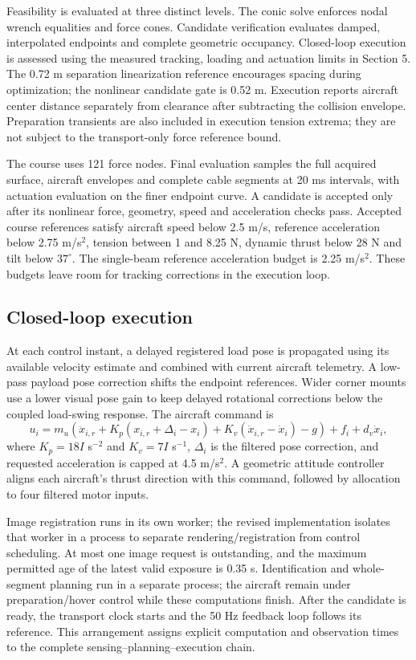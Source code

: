 Feasibility is evaluated at three distinct levels. The conic solve enforces nodal wrench equalities and force cones. Candidate verification evaluates damped, interpolated endpoints and complete geometric occupancy. Closed-loop execution is assessed using the measured tracking, loading and actuation limits in Section 5. The 0.72 m separation linearization reference encourages spacing during optimization; the nonlinear candidate gate is 0.52 m. Execution reports aircraft center distance separately from clearance after subtracting the collision envelope. Preparation transients are also included in execution tension extrema; they are not subject to the transport-only force reference bound.

The course uses 121 force nodes. Final evaluation samples the full acquired surface, aircraft envelopes and complete cable segments at 20 ms intervals, with actuation evaluation on the finer endpoint curve. A candidate is accepted only after its nonlinear force, geometry, speed and acceleration checks pass. Accepted course references satisfy aircraft speed below 2.5 m/s, reference acceleration below 2.75 m/s$^2$, tension between 1 and 8.25 N, dynamic thrust below 28 N and tilt below $37^\circ$. The single-beam reference acceleration budget is 2.25 m/s$^2$. These budgets leave room for tracking corrections in the execution loop.

\subsection{Closed-loop execution}
At each control instant, a delayed registered load pose is propagated using its available velocity estimate and combined with current aircraft telemetry. A low-pass payload pose correction shifts the endpoint references. Wider corner mounts use a lower visual pose gain to keep delayed rotational corrections below the coupled load-swing response. The aircraft command is
\begin{equation}
 u_i=m_u\left(\ddot x_{i,r}+K_p(x_{i,r}+\Delta_i-x_i)
      +K_v(\dot x_{i,r}-\dot x_i)-g\right)+f_i+d_v\dot x_i,
 \label{eq:controller}
\end{equation}
where $K_p=18I$ s$^{-2}$ and $K_v=7I$ s$^{-1}$, $\Delta_i$ is the filtered pose correction, and requested acceleration is capped at 4.5 m/s$^2$. A geometric attitude controller~\cite{lee2010} aligns each aircraft's thrust direction with this command, followed by allocation to four filtered motor inputs.

Image registration runs in its own worker; the revised implementation isolates that worker in a process to separate rendering/registration from control scheduling. At most one image request is outstanding, and the maximum permitted age of the latest valid exposure is 0.35 s. Identification and whole-segment planning run in a separate process; the aircraft remain under preparation/hover control while these computations finish. After the candidate is ready, the transport clock starts and the 50 Hz feedback loop follows its reference. This arrangement assigns explicit computation and observation times to the complete sensing--planning--execution chain.
